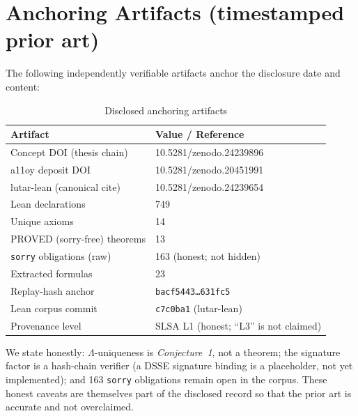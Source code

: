 \documentclass[10pt,conference]{IEEEtran}
\begin{document}
\section{Anchoring Artifacts (timestamped prior art)}
The following independently verifiable artifacts anchor the disclosure date and content:
\begin{table}[h]
\centering
\caption{Disclosed anchoring artifacts}
\begin{tabular}{@{}ll@{}}
\toprule
Artifact & Value / Reference \\
\midrule
Concept DOI (thesis chain) & 10.5281/zenodo.24239896 \\
a11oy deposit DOI & 10.5281/zenodo.20451991 \\
lutar-lean (canonical cite) & 10.5281/zenodo.24239654 \\
Lean declarations & 749 \\
Unique axioms & 14 \\
PROVED (sorry-free) theorems & 13 \\
\texttt{sorry} obligations (raw) & 163 (honest; not hidden) \\
Extracted formulas & 23 \\
Replay-hash anchor & \texttt{bacf5443\ldots631fc5} \\
Lean corpus commit & \texttt{c7c0ba1} (lutar-lean) \\
Provenance level & SLSA L1 (honest; ``L3'' is not claimed) \\
\bottomrule
\end{tabular}
\end{table}

We state honestly: $\Lambda$-uniqueness is \emph{Conjecture~1}, not a theorem; the
signature factor is a hash-chain verifier (a DSSE signature binding is a placeholder, not
yet implemented); and 163 \texttt{sorry} obligations remain open in the corpus. These
honest caveats are themselves part of the disclosed record so that the prior art is
accurate and not overclaimed.
\end{document}

